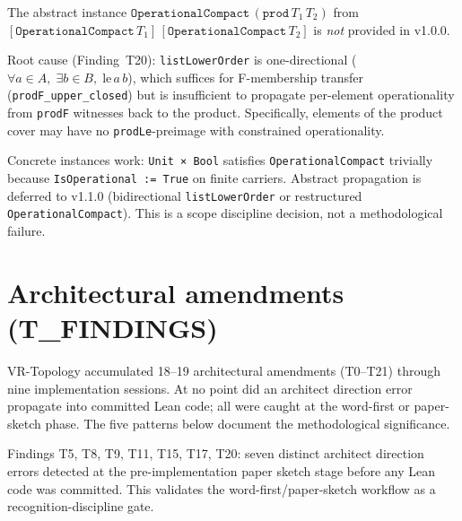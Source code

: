 \begin{remark}
\label{rem:prod_not_ready}
\notready
{}
The abstract instance
$\texttt{OperationalCompact}\,(\texttt{prod}\,T_1\,T_2)$ from
$[\texttt{OperationalCompact}\,T_1]\,[\texttt{OperationalCompact}\,T_2]$
is \emph{not} provided in v1.0.0.

Root cause (Finding~T20): \texttt{listLowerOrder} is one-directional
($\forall a \in A,\; \exists b \in B,\; \text{le}\,a\,b$), which
suffices for F-membership transfer (\texttt{prodF\_upper\_closed}) but
is insufficient to propagate per-element operationality from
\texttt{prodF} witnesses back to the product.  Specifically, elements
of the product cover may have no \texttt{prodLe}-preimage with
constrained operationality.

Concrete instances work: \texttt{Unit × Bool} satisfies
\texttt{OperationalCompact} trivially because \texttt{IsOperational :=
True} on finite carriers.  Abstract propagation is deferred to v1.1.0
(bidirectional \texttt{listLowerOrder} or restructured
\texttt{OperationalCompact}).  This is a scope discipline decision, not
a methodological failure.
\end{remark}

\section{Architectural amendments (T\_FINDINGS)}
\label{sec:topology_tfindings}

VR-Topology accumulated 18--19 architectural amendments (T0--T21) through
nine implementation sessions.  At no point did an architect direction error
propagate into committed Lean code; all were caught at the word-first or
paper-sketch phase.  The five patterns below document the methodological
significance.

\begin{remark}
\label{rem:T_pattern1}
\leanok
{}
Findings T5, T8, T9, T11, T15, T17, T20: seven distinct architect
direction errors detected at the pre-implementation paper sketch stage
before any Lean code was committed.  This validates the
word-first/paper-sketch workflow as a recognition-discipline gate.
\end{remark}

